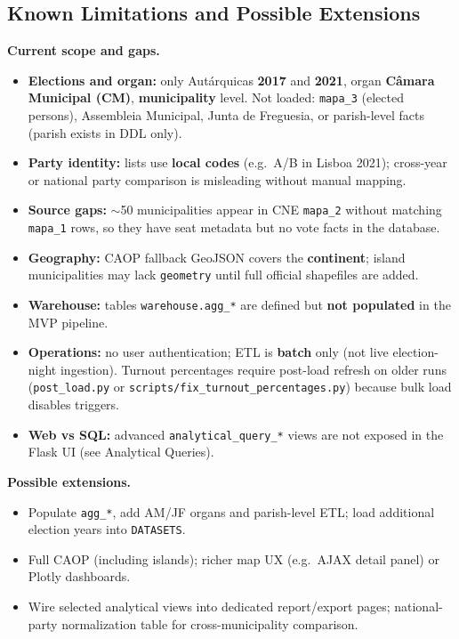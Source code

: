 \subsection{Known Limitations and Possible Extensions}
\textbf{Current scope and gaps.}
\begin{itemize}
    \item \textbf{Elections and organ:} only Autárquicas \textbf{2017} and \textbf{2021}, organ \textbf{Câmara Municipal (CM)}, \textbf{municipality} level. Not loaded: \texttt{mapa\_3} (elected persons), Assembleia Municipal, Junta de Freguesia, or parish-level facts (parish exists in DDL only).
    \item \textbf{Party identity:} lists use \textbf{local codes} (e.g.\ A/B in Lisboa 2021); cross-year or national party comparison is misleading without manual mapping.
    \item \textbf{Source gaps:} $\sim$50 municipalities appear in CNE \texttt{mapa\_2} without matching \texttt{mapa\_1} rows, so they have seat metadata but no vote facts in the database.
    \item \textbf{Geography:} CAOP fallback GeoJSON covers the \textbf{continent}; island municipalities may lack \texttt{geometry} until full official shapefiles are added.
    \item \textbf{Warehouse:} tables \texttt{warehouse.agg\_*} are defined but \textbf{not populated} in the MVP pipeline.
    \item \textbf{Operations:} no user authentication; ETL is \textbf{batch} only (not live election-night ingestion). Turnout percentages require post-load refresh on older runs (\texttt{post\_load.py} or \texttt{scripts/fix\_turnout\_percentages.py}) because bulk load disables triggers.
    \item \textbf{Web vs SQL:} advanced \texttt{analytical\_query\_*} views are not exposed in the Flask UI (see Analytical Queries).
\end{itemize}

\textbf{Possible extensions.}
\begin{itemize}
    \item Populate \texttt{agg\_*}, add AM/JF organs and parish-level ETL; load additional election years into \texttt{DATASETS}.
    \item Full CAOP (including islands); richer map UX (e.g.\ AJAX detail panel) or Plotly dashboards.
    \item Wire selected analytical views into dedicated report/export pages; national-party normalization table for cross-municipality comparison.
\end{itemize}
